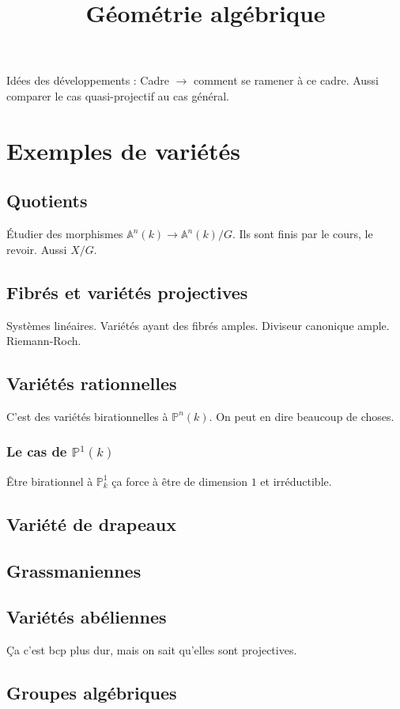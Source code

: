 \documentclass[a4paper,12pt]{book}
\title{Géométrie algébrique}
\date{}
\newcommand{\A}{\mathbb{A}}
\renewcommand{\P}{\mathbb{P}}
\theoremstyle{plain}
\theoremstyle{definition}
\theoremstyle{remark}
\begin{document}
\maketitle
\tableofcontents



Idées des développements : Cadre $\to$ comment se ramener à ce cadre.
Aussi comparer le cas quasi-projectif au cas général.

\chapter{Exemples de variétés}
\section{Quotients}
Étudier des morphismes $\A^n(k)\to \A^n(k)/G$. Ils sont finis par 
le cours, le revoir. Aussi $X/G$.

\section{Fibrés et variétés projectives}
Systèmes linéaires. Variétés ayant des fibrés amples. Diviseur
canonique ample. Riemann-Roch.

\section{Variétés rationnelles}
C'est des variétés birationnelles à $\P^n(k)$. On peut en dire 
beaucoup de choses.
\subsection*{Le cas de $\P^1(k)$}
Être birationnel à $\P^1_k$ ça force à être de dimension $1$ et 
irréductible.


\section{Variété de drapeaux}
\section{Grassmaniennes}
\section{Variétés abéliennes}
Ça c'est bcp plus dur, mais on sait qu'elles sont projectives.
\section{Groupes algébriques}
\end{document}
